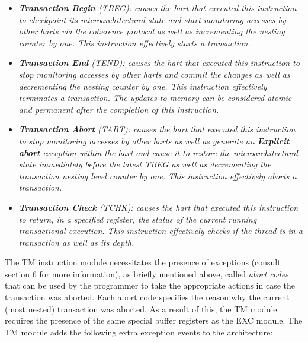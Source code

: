         \begin{itemize}

            \item \textit{\textbf{Transaction Begin} (TBEG): causes the hart that executed this instruction to checkpoint its microarchitectural state and start monitoring accesses by other harts via the coherence protocol as well as incrementing the nesting counter by one. This instruction effectively starts a transaction.}

            \item \textit{\textbf{Transaction End} (TEND): causes the hart that executed this instruction to stop monitoring accesses by other harts and commit the changes as well as decrementing the nesting counter by one. This instruction effectively terminates a transaction. The updates to memory can be considered atomic and permanent after the completion of this instruction.}

            \item \textit{\textbf{Transaction Abort} (TABT): causes the hart that executed this instruction to stop monitoring accesses by other harts as well as generate an \textbf{Explicit abort} exception within the hart and cause it to restore the microarchitectural state immediately before the latest TBEG as well as decrementing the transaction nesting level counter by one. This instruction effectively aborts a transaction.}

            \item \textit{\textbf{Transaction Check} (TCHK): causes the hart that executed this instruction to return, in a specified register, the status of the current running transactional execution. This instruction effectively checks if the thread is in a transaction as well as its depth.}

        \end{itemize}

        The TM instruction module necessitates the presence of exceptions (consult section 6 for more information), as briefly mentioned above, called \textit{abort codes} that can be used by the programmer to take the appropriate actions in case the transaction was aborted. Each abort code specifies the reason why the current (most nested) transaction was aborted. As a result of this, the TM module requires the presence of the same special buffer registers as the EXC module. The TM module adds the following extra exception events to the architecture:

